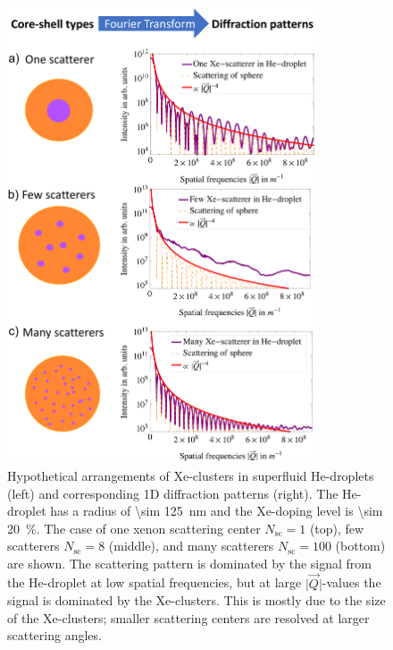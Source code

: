 \begin{figure}
 	\centering
 		\includegraphics[width=0.82\textwidth]{images/results/plum-pudding_numbered.png}
 	\caption[Hypothetical arrangements of Xe-clusters within He-droplets.]{Hypothetical arrangements of Xe-clusters in superfluid He-droplets (left) and corresponding 1D diffraction patterns (right). The He-droplet has a radius of \SI{\sim 125}{\nano\meter} and the Xe-doping level is \SI{\sim 20}{\percent}. The case of one xenon scattering center $N_{\text{sc}}=1$ (top), few scatterers $N_{\text{sc}}=8$ (middle), and many scatterers $N_{\text{sc}}=100$ (bottom) are shown. The scattering pattern is dominated by the signal from the He-droplet at low spatial frequencies, but at large $\lvert\vec{Q}\rvert$-values the signal is dominated by the Xe-clusters. This is mostly due to the size of the Xe-clusters; smaller scattering centers are resolved at larger scattering angles.}
 	\label{fig:HeXe-plum-pudding}
\end{figure}
